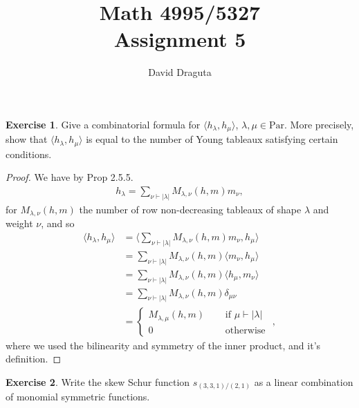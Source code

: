 \documentclass[12pt]{extarticle}
\title{ Math 4995/5327
  \\
  Assignment 5}
\author{David Draguta}
\newcommand{\abs}[1]{|#1|}
\newcommand{\<}{\langle}
\renewcommand{\>}{\rangle}
\theoremstyle{definition}
\newtheorem{exercise}{Exercise}
\begin{document}
\maketitle

\begin{exercise}
  Give a combinatorial formula for $\< h_{\lambda}, h_{\mu} \>$, $\lambda, \mu \in \text{Par}$. More precisely, show that $\<h_{\lambda}, h_{\mu}\>$ is equal to the number of Young tableaux satisfying certain conditions. 
\end{exercise}
\begin{proof}
  We have by Prop 2.5.5.
  \begin{align*}
    h_{\lambda} = \sum\limits_{\nu \vdash \abs{\lambda}} M_{\lambda, \nu}(h,m)m_{\nu},
  \end{align*}
   for $M_{\lambda, \nu}(h,m)$ the number of row non-decreasing tableaux of shape $\lambda$ and weight $\nu$, and so
  \begin{align*}
    \< h_{\lambda}, h_{\mu} \>
    &= \< \sum\limits_{\nu \vdash \abs{\lambda}} M_{\lambda, \nu}(h,m)m_{\nu}, h_{\mu} \> \\
    &= \sum\limits_{\nu \vdash \abs{\lambda}} M_{\lambda, \nu}(h,m) \< m_{\nu}, h_{\mu} \> \\
    &= \sum\limits_{\nu \vdash \abs{\lambda}} M_{\lambda, \nu}(h,m) \< h_{\mu}, m_{\nu}\> \\
    &= \sum\limits_{\nu \vdash \abs{\lambda}} M_{\lambda, \nu}(h,m) \delta_{\mu \nu} \\
    &= 
    \begin{cases}
      M_{\lambda, \mu}(h,m) \quad & \text{ if } \mu \vdash \abs{\lambda} \\
      0 \quad & \text { otherwise }
    \end{cases},
  \end{align*}
  where we used the bilinearity and symmetry of the inner product, and it's definition.
\end{proof}
\begin{exercise}
  Write the skew Schur function $s_{(3,3,1)/(2,1)}$ as a linear combination of monomial symmetric functions. 
\end{exercise}
\end{document}
